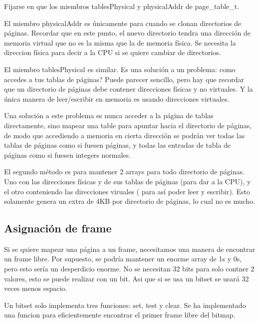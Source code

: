 \documentclass{report}
\begin{document}
Fijarse en que los miembros tablesPhysical y physicalAddr de page\_table\_t.

El miembro physicalAddr es únicamente para cuando se clonan directorios de páginas. Recordar que en este punto, el nuevo directorio tendra una dirección de memoria virtual que no es la misma que la de memoria física. Se necesita la direccion física para decir a la CPU si se quiere cambiar de directorios.

El miembro tablesPhysical es similar. Es una solución a un problema: como accedes a tus tablas de páginas? Puede parecer sencillo, pero hay que recordar que un directorio de páginas debe contener direcciones físicas y no virtuales. Y la única manera de leer/escribir en memoria es usando direcciones virtuales.

Una solución a este problema es nunca acceder a la página de tablas directamente, sino mapear una table para apuntar hacia el directorio de páginas, de modo que accediendo a memoria en cierta dirección se podrán ver todas las tablas de páginas como si fuesen páginas, y todas las entradas de tabla de páginas como si fuesen integers normales.

El segundo método es para mantener 2 arrays para todo directorio de páginas. Uno con las direcciones físicas y de sus tablas de páginas (para dar a la CPU), y el otro conteniendo las direcciones viruales ( para así poder leer y escribir). Esto solamente genera un extra de 4KB por directorio de páginas, lo cual no es mucho.

\subsection{Asignación de frame}

Si se quiere mapear una página a un frame, necesitamos una manera de encontrar un frame libre. Por supuesto, se podría mantener un enorme array de 1s y 0s, pero esto sería un desperdicio enorme. No se necesitan 32 bits para solo contner 2 valores, esto se puede realizar con un bit. Asi que si se usa un bitset se usará 32 veces menos espacio.

Un bitset solo implementa tres funciones: set, test y clear. Se ha implementado una funcion para eficientemente encontrar el primer frame libre del bitmap.
\end{document}
